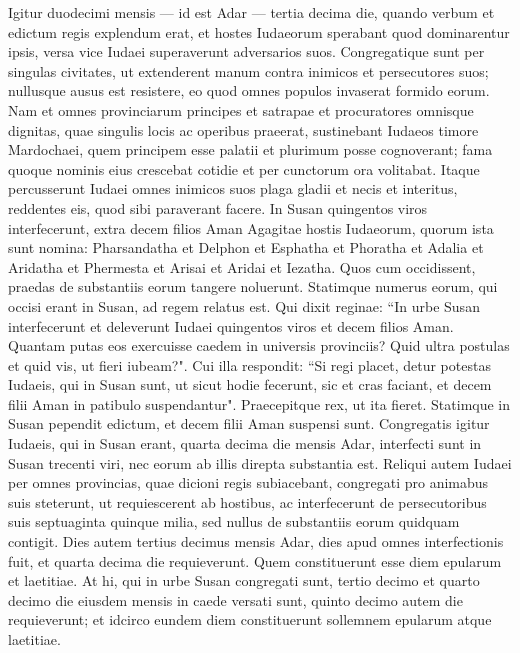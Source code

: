 \begin{biblechapter} 
\verse Igitur duodecimi mensis — id est Adar — tertia decima die, quando verbum et edictum regis explendum erat, et hostes Iudaeorum sperabant quod dominarentur ipsis, versa vice Iudaei superaverunt adversarios suos. 
\verse Congregatique sunt per singulas civitates, ut extenderent manum contra inimicos et persecutores suos; nullusque ausus est resistere, eo quod omnes populos invaserat formido eorum. 
\verse Nam et omnes provinciarum principes et satrapae et procuratores omnisque dignitas, quae singulis locis ac operibus praeerat, sustinebant Iudaeos timore Mardochaei, 
\verse quem principem esse palatii et plurimum posse cognoverant; fama quoque nominis eius crescebat cotidie et per cunctorum ora volitabat. 
\verse Itaque percusserunt Iudaei omnes inimicos suos plaga gladii et necis et interitus, reddentes eis, quod sibi paraverant facere. 
\verse In Susan quingentos viros interfecerunt, extra decem filios Aman Agagitae hostis Iudaeorum, quorum ista sunt nomina: 
\verse Pharsandatha et Delphon et Esphatha 
\verse et Phoratha et Adalia et Aridatha 
\verse et Phermesta et Arisai et Aridai et Iezatha. 
\verse Quos cum occidissent, praedas de substantiis eorum tangere noluerunt. 
\verse Statimque numerus eorum, qui occisi erant in Susan, ad regem relatus est.  
\verse Qui dixit reginae: “In urbe Susan interfecerunt et deleverunt Iudaei quingentos viros et decem filios Aman. Quantam putas eos exercuisse caedem in universis provinciis? Quid ultra postulas et quid vis, ut fieri iubeam?". 
\verse Cui illa respondit: “Si regi placet, detur potestas Iudaeis, qui in Susan sunt, ut sicut hodie fecerunt, sic et cras faciant, et decem filii Aman in patibulo suspendantur". 
\verse Praecepitque rex, ut ita fieret. Statimque in Susan pependit edictum, et decem filii Aman suspensi sunt. 
\verse Congregatis igitur Iudaeis, qui in Susan erant, quarta decima die mensis Adar, interfecti sunt in Susan trecenti viri, nec eorum ab illis direpta substantia est. 
\verse Reliqui autem Iudaei per omnes provincias, quae dicioni regis subiacebant, congregati pro animabus suis steterunt, ut requiescerent ab hostibus, ac interfecerunt de persecutoribus suis septuaginta quinque milia, sed nullus de substantiis eorum quidquam contigit. 
\verse Dies autem tertius decimus mensis Adar, dies apud omnes interfectionis fuit, et quarta decima die requieverunt. Quem constituerunt esse diem epularum et laetitiae. 
\verse At hi, qui in urbe Susan congregati sunt, tertio decimo et quarto decimo die eiusdem mensis in caede versati sunt, quinto decimo autem die requieverunt; et idcirco eundem diem constituerunt sollemnem epularum atque laetitiae. 

\end{biblechapter}
